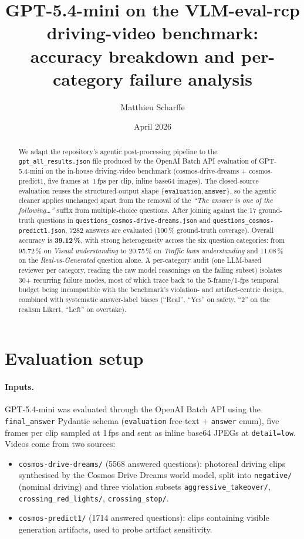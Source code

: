 \documentclass[11pt,a4paper]{article}
\title{GPT-5.4-mini on the VLM-eval-rcp driving-video benchmark:\\
accuracy breakdown and per-category failure analysis}
\author{Matthieu Scharffe}
\date{April 2026}
\newcommand{\pct}[1]{#1\,\%}
\newcommand{\code}[1]{\texttt{#1}}
\begin{document}
\maketitle

\begin{abstract}
We adapt the repository's agentic post-processing pipeline to the
\code{gpt\_all\_results.json} file produced by the OpenAI Batch API
evaluation of GPT-5.4-mini on the in-house driving-video benchmark
(cosmos-drive-dreams + cosmos-predict1, five frames at~1\,fps per clip,
inline base64 images). The closed-source evaluation reuses the
structured-output shape \(\{\texttt{evaluation},\texttt{answer}\}\), so the
agentic cleaner applies unchanged apart from the removal of the
\emph{``The answer is one of the following\dots''} suffix from multiple-choice
questions. After joining against the 17 ground-truth questions in
\code{questions\_cosmos-drive-dreams.json} and
\code{questions\_cosmos-predict1.json}, \num{7282} answers are evaluated
(100\,\% ground-truth coverage). Overall accuracy is
\textbf{\pct{39.12}}, with strong heterogeneity across the six question
categories: from \pct{95.72} on \emph{Visual understanding} to
\pct{20.75} on \emph{Traffic laws understanding} and \pct{11.08} on
the \emph{Real-vs-Generated} question alone. A per-category audit
(one LLM-based reviewer per category, reading the raw model reasonings
on the failing subset) isolates 30+ recurring failure modes, most of
which trace back to the 5-frame/1-fps temporal budget being
incompatible with the benchmark's violation- and artifact-centric
design, combined with systematic answer-label biases (``Real'',
``Yes'' on safety, ``2'' on the realism Likert, ``Left'' on overtake).
\end{abstract}

\section{Evaluation setup}
\label{sec:setup}

\paragraph{Inputs.} GPT-5.4-mini was evaluated through the OpenAI
Batch API using the \code{final\_answer} Pydantic schema
(\code{evaluation} free-text + \code{answer} enum), five frames per
clip sampled at 1\,fps and sent as inline base64 JPEGs at
\code{detail=low}. Videos come from two sources:
\begin{itemize}
  \item \code{cosmos-drive-dreams/} (\num{5568} answered questions): photoreal
  driving clips synthesised by the Cosmos Drive Dreams world model,
  split into \code{negative/} (nominal driving) and three violation
  subsets \code{aggressive\_takeover/}, \code{crossing\_red\_lights/},
  \code{crossing\_stop/}.
  \item \code{cosmos-predict1/} (\num{1714} answered questions): clips
  containing visible generation artifacts, used to probe artifact
  sensitivity.
\end{itemize}
\end{document}
